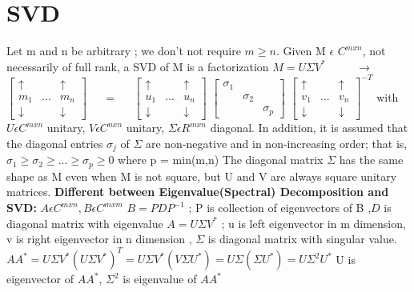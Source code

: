 \documentclass[]{finalproject}
\begin{document}
\section{SVD} \label{svd}
\begin{flushleft}
Let m and n be arbitrary ; we don’t not require $m \geqslant n$. Given M $\epsilon$ $C^{mxn}$, not necessarily of full rank, a SVD of M is a factorization \newline \newline
$ M = U \Sigma V^{*} $ $\qquad$ $\longrightarrow$ $\qquad$
$\begin{bmatrix} 
\uparrow &  & \uparrow\\
m_{1} & ... & m_{n}\\
\downarrow & & \downarrow
\end{bmatrix}$
$\quad$ = $\quad$
$\begin{bmatrix} 
\uparrow &  & \uparrow\\
u_{1} & ... & u_{n}\\
\downarrow & & \downarrow
\end{bmatrix}$
$\begin{bmatrix}
\sigma_{1} &  & \\
 & \sigma_{2} & \\
 & & \sigma_{p}
\end{bmatrix}$
$\begin{bmatrix} 
\uparrow &  & \uparrow\\
v_{1} & ... & v_{n}\\
\downarrow & & \downarrow
\end{bmatrix} ^{-T}$
\newline \newline \newline
with $U \epsilon C^{mxn}$ unitary, $V \epsilon C^{nxn}$ unitary, $\Sigma \epsilon R^{mxn}$ diagonal. \linebreak
In addition, it is assumed that the diagonal entries $\sigma_{j}$ of $\Sigma$ are non-negative and in non-increasing order; 
 that is, $\sigma_{1} \geqslant \sigma_{2} \geqslant . . .  \geqslant \sigma_{p} \geqslant 0$ where p = min(m,n) The diagonal matrix $\Sigma$ has the same shape as M even when M is not square, but U and V are always square unitary matrices. \cite{svd} \newline \newline
\textbf{Different between Eigenvalue(Spectral) Decomposition and SVD:}\newline
$ A \epsilon C^{mxn}, B \epsilon C^{mxm} $ \newline
$ B = P D P^{-1} $ ; P is collection of eigenvectors of B ,$ D $ is diagonal matrix with eigenvalue \newline
$ A = U \Sigma V^{*}$ ; u is left eigenvector in m dimension, v is right eigenvector in n dimension , $ \Sigma $ is diagonal matrix with singular value.\newline
 $AA^{*} = U\Sigma V^{*}(U \Sigma V^{*})^{T} = U\Sigma V^{*}(V \Sigma U^{*}) =  U\Sigma(\Sigma U^{*}) = U\Sigma^{2} U^{*}$ U is eigenvector of $AA^{*}$, $\Sigma^{2} $  is eigenvalue of $AA^{*}$ \newline \newline
 


\end{flushleft}
\end{document}
